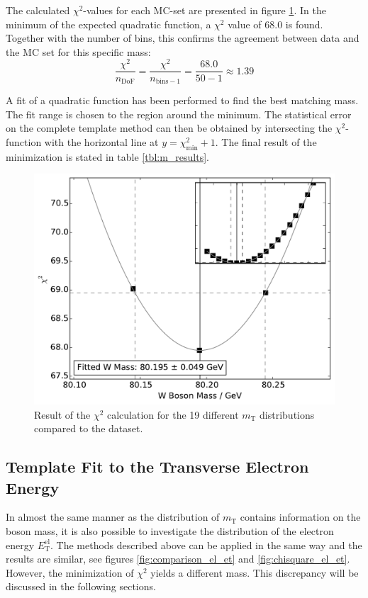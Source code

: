 \documentclass[
	paper=A4,
	parskip=full,
	chapterprefix=true,
	11pt,
	headings=normal,
	bibliography=totoc,
	listof=totoc,
	titlepage=on,
]{scrreprt}
\newcommand{\ELET}{\ensuremath{{E_\mathrm{T}^\mathrm{el}}}\xspace}
\newcommand{\MT}{\ensuremath{{m_\mathrm{T}}}\xspace}
\begin{document}
The calculated $\chi^2$-values for each MC-set are presented in figure \ref{fig:chisquare_m_t}. In the minimum of the expected quadratic function, a $\chi^2 $ value of \num{68.0} is found. Together with the number of bins, this confirms the agreement between data and the MC set for this specific mass:
\begin{equation}
\frac{\chi^2}{n_{\mathrm{DoF}}} = \frac{\chi^2}{n_{\mathrm{bins}-1}} =  \frac{\num{68.0}}{\num{50} - \num{1}} \approx \num{1.39} 
\end{equation}

A fit of a quadratic function has been performed to find the best matching \PW mass. The fit range is chosen to the region around the minimum. The statistical error on the complete template method can then be obtained by intersecting the $\chi^2$-function with the horizontal line at $y=\chi^2_{\mathrm{min}}+1$. The final result of the minimization is stated in table \ref{tbl:m_results}.


\begin{figure}
	\centering
	\includegraphics{chisquare_m_t}
	\caption{Result of the $\chi^2$ calculation for the 19 different \MT distributions compared to the dataset.}
	\label{fig:chisquare_m_t}
\end{figure}


\subsection{Template Fit to the Transverse Electron Energy}
In almost the same manner as the distribution of \MT contains information on the \PW boson mass, it is also possible to investigate the distribution of the electron energy \ELET. The methods described above can be applied in the same way and the results are similar, see figures \ref{fig:comparison_el_et} and \ref{fig:chisquare_el_et}. However, the minimization of $\chi^2$ yields a different \PW mass. This discrepancy will be discussed in the following sections.
\end{document}
